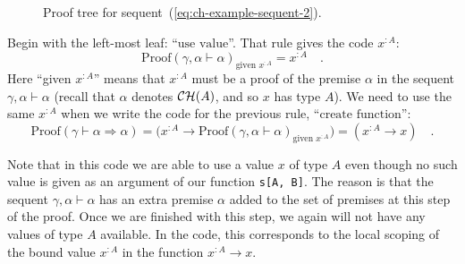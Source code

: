 \begin{figure}
\begin{centering}
{\footnotesize{}}%
\par\end{centering}
\caption{Proof tree for sequent~(\ref{eq:ch-example-sequent-2}).\label{fig:Proof-of-the-sequent-example-2}}
\end{figure}

Begin with the left-most leaf: \textsf{``}$\text{use value}$\textsf{''}. That rule
gives the code $x^{:A}$:
\[
\text{Proof}\left(\gamma,\alpha\vdash\alpha\right)_{\text{given }x^{:A}}=x^{:A}\quad.
\]
Here \textsf{``}given $x^{:A}$\textsf{''} means that $x^{:A}$ must be a proof of
the premise $\alpha$ in the sequent $\gamma,\alpha\vdash\alpha$
(recall that $\alpha$ denotes ${\cal CH}(A)$, and so $x$ has type
$A$). We need to use the same $x^{:A}$ when we write the code for
the previous rule, \textsf{``}$\text{create function}$\textsf{''}:
\[
\text{Proof}\left(\gamma\vdash\alpha\Rightarrow\alpha\right)=\big(x^{:A}\rightarrow\text{Proof}\left(\gamma,\alpha\vdash\alpha\right)_{\text{given }x^{:A}}\big)=(x^{:A}\rightarrow x)\quad.
\]

Note that in this code we are able to use a value $x$ of type $A$
even though no such value is given as an argument of our function
\lstinline!s[A, B]!. The reason is that the sequent $\gamma,\alpha\vdash\alpha$
has an extra premise $\alpha$ added to the set of premises at this
step of the proof. Once we are finished with this step, we again will
not have any values of type $A$ available. In the code, this corresponds
to the local scoping of the bound value $x^{:A}$ in the function
$x^{:A}\rightarrow x$. 

